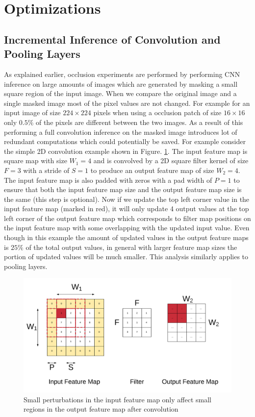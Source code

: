\section{Optimizations}

\subsection{Incremental Inference of Convolution and Pooling Layers}\label{sec:ivm}

As explained earlier, occlusion experiments are performed by performing CNN inference on large amounts of images which are generated by masking a small square region of the input image.
When we compare the original image and a single masked image most of the pixel values are not changed. For example for an input image of size $224\times224$ pixels when using a occlusion patch of size $16\times16$ only $0.5\%$ of the pixels are different between the two images.
As a result of this performing a full convolution inference on the masked image introduces lot of redundant computations which could potentially be saved.
For example consider the simple 2D convolution example shown in Figure. \ref{fig:perturbation}.
The input feature map is square map with size $W_1=4$ and is convolved by a 2D square filter kernel of size $F=3$ with a stride of $S=1$ to produce an output feature map of size $W_2=4$.
The input feature map is also padded with zeros with a pad width of $P=1$ to ensure that both the input feature map size and the output feature map size is the same (this step is optional).
Now if we update the top left corner value in the input feature map (marked in red), it will only update 4 output values at the top left corner of the output feature map which corresponds to filter map positions on the input feature map with some overlapping with the updated input value.
Even though in this example the amount of updated values in the output feature maps is $25\%$ of the total output values, in general with larger feature map sizes the portion of updated values will be much smaller.
This analysis similarly applies to pooling layers.

\begin{figure}
  \includegraphics[width=\columnwidth]{./images/small_perturbations}
  \caption{Small perturbations in the input feature map only affect small regions in the output feature map after convolution}
  \label{fig:perturbation}
\end{figure}

